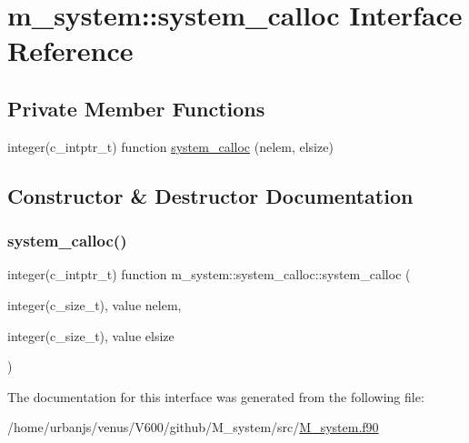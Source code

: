 \hypertarget{interfacem__system_1_1system__calloc}{}\section{m\+\_\+system\+:\+:system\+\_\+calloc Interface Reference}
\label{interfacem__system_1_1system__calloc}
\subsection*{Private Member Functions}
\begin{DoxyCompactItemize}
\item 
integer(c\+\_\+intptr\+\_\+t) function \mbox{\hyperlink{interfacem__system_1_1system__calloc_a5b3472fde916f93c45484a27a684133f}{system\+\_\+calloc}} (nelem, elsize)
\end{DoxyCompactItemize}


\subsection{Constructor \& Destructor Documentation}
\mbox{\label{interfacem__system_1_1system__calloc_a5b3472fde916f93c45484a27a684133f}} 
\subsubsection{\texorpdfstring{system\+\_\+calloc()}{system\_calloc()}}
{\footnotesize\ttfamily integer(c\+\_\+intptr\+\_\+t) function m\+\_\+system\+::system\+\_\+calloc\+::system\+\_\+calloc (\begin{DoxyParamCaption}\item[{integer(c\+\_\+size\+\_\+t), value}]{nelem,  }\item[{integer(c\+\_\+size\+\_\+t), value}]{elsize }\end{DoxyParamCaption})\hspace{0.3cm}{\ttfamily [private]}}



The documentation for this interface was generated from the following file\+:\begin{DoxyCompactItemize}
\item 
/home/urbanjs/venus/\+V600/github/\+M\+\_\+system/src/\mbox{\hyperlink{M__system_8f90}{M\+\_\+system.\+f90}}\end{DoxyCompactItemize}
